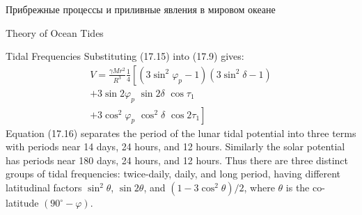 \begin{chapter}{Прибрежные процессы и приливные явления в мировом океане}
\begin{section}{Theory of Ocean Tides}
\begin{paragraph}{Tidal Frequencies}
Substituting (17.15) into (17.9) gives:
\begin{multline}
V = \frac{\gamma M r^{2}}{R^{3}} \frac{1}{4} \left[ \left( 3 \sin ^{2} \varphi_p - 1
 \right) \left( 3 \sin ^{2} \delta -1 \right)  \right. \\
 + 3 \sin 2 \varphi_p \,\, \sin 2 \delta \,\, \cos \tau _{1} \\
 + \left. 3 \cos^2 \varphi_p \,\, \cos^2 \delta \,\, \cos 2 \tau _1 \right]
\end{multline}
Equation (17.16) separates the period of the lunar tidal potential
into three terms with periods near 14 days, 24 hours, and 12
hours. Similarly the solar potential has periods near 180 days, 24
hours, and 12 hours. Thus there are three distinct groups of tidal
frequencies: twice-daily, daily, and long period, having different
latitudinal factors $\sin^2 \theta $, $\sin 2 \theta$, and $(1 - 3
\cos^2 \theta )/2$, where $\theta $ is the co-latitude $\left(
90^{\circ} - \varphi \right) $.
%


\end{paragraph}
\end{section}
\end{chapter}
